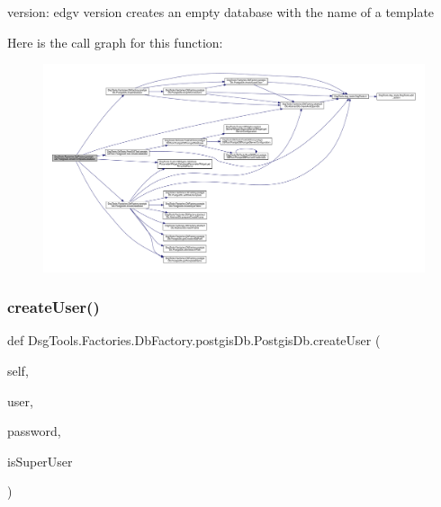 \begin{DoxyVerb}version: edgv version
creates an empty database with the name of a template
\end{DoxyVerb}
 Here is the call graph for this function\+:
\nopagebreak
\begin{figure}[H]
\begin{center}
\leavevmode
\includegraphics[width=350pt]{class_dsg_tools_1_1_factories_1_1_db_factory_1_1postgis_db_1_1_postgis_db_ac9366aea071d6c0baa3c02094a2b69a6_cgraph}
\end{center}
\end{figure}
\mbox{\label{class_dsg_tools_1_1_factories_1_1_db_factory_1_1postgis_db_1_1_postgis_db_ae9c136c6ecbd705706f3f583e4a3cce5}} 
\subsubsection{\texorpdfstring{create\+User()}{createUser()}}
{\footnotesize\ttfamily def Dsg\+Tools.\+Factories.\+Db\+Factory.\+postgis\+Db.\+Postgis\+Db.\+create\+User (\begin{DoxyParamCaption}\item[{}]{self,  }\item[{}]{user,  }\item[{}]{password,  }\item[{}]{is\+Super\+User }\end{DoxyParamCaption})}

